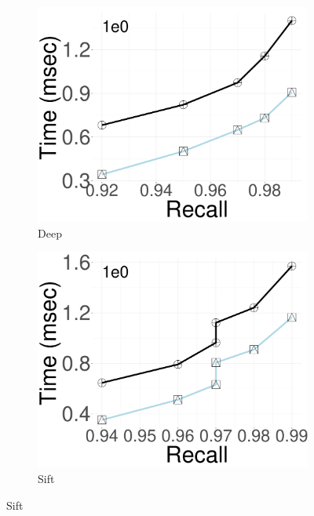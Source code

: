 \begin{figure}[ht]
            \begin{subfigure}[b]{0.23\textwidth}
            \centering
                \includegraphics[width=\textwidth]{../img/oigas/Search/FINAL25GB/deep/Time.pdf}
                \caption{Deep}
        \label{fig:oigas:search:25:Deep}
    \end{subfigure}
            \begin{subfigure}[b]{0.23\textwidth}
            \centering
                \includegraphics[width=\textwidth]{../img/oigas/Search/FINAL25GB/sift/Time.pdf}
                \caption{Sift}
        \label{fig:oigas:search:25:Sift}
    \end{subfigure}

\end{figure}
